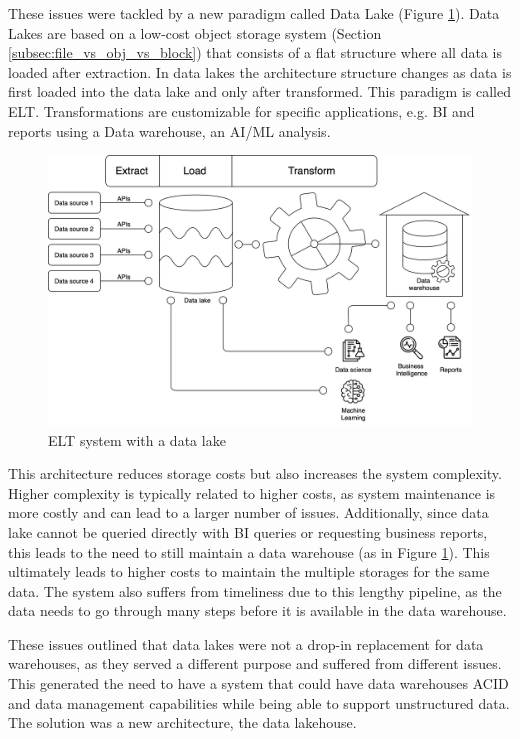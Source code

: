 These issues were tackled by a new paradigm called Data Lake (Figure \ref{fig:ELT+DL}). Data Lakes are based on a low-cost object storage system (Section \ref{subsec:file_vs_obj_vs_block}) that consists of a flat structure where all data is loaded after extraction. In data lakes the architecture structure changes as data is first loaded into the data lake and only after transformed. This paradigm is called \gls{ELT}. Transformations are customizable for specific applications, e.g. \gls{BI} and reports using a Data warehouse, an \gls{AI}/\gls{ML} analysis.

\begin{figure}[!ht]
    \begin{center}
      \includegraphics[width=\textwidth]{figures/2-background/DeltaLake_evolution-ELT+DL.png}
    \end{center}
    \caption{\gls{ELT} system with a data lake}
    \label{fig:ELT+DL}
\end{figure}

This architecture reduces storage costs but also increases the system complexity. Higher complexity is typically related to higher costs, as system maintenance is more costly and can lead to a larger number of issues. Additionally, since data lake cannot be queried directly with \gls{BI} queries or requesting business reports, this leads to the need to still maintain a data warehouse (as in Figure \ref{fig:ELT+DL}). This ultimately leads to higher costs to maintain the multiple storages for the same data. The system also suffers from timeliness due to this lengthy pipeline, as the data needs to go through many steps before it is available in the data warehouse. 

These issues outlined that data lakes were not a drop-in replacement for data warehouses, as they served a different purpose and suffered from different issues. This generated the need to have a system that could have data warehouses \gls{ACID} and data management capabilities while being able to support unstructured data. The solution was a new architecture, the data lakehouse. 

